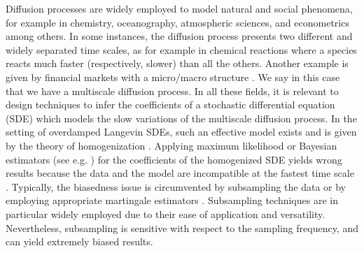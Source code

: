 \documentclass[10pt]{article}
\begin{document}
Diffusion processes are widely employed to model natural and social phenomena, for example in chemistry, oceanography, atmospheric sciences, and econometrics among others. In some instances, the diffusion process presents two different and widely separated time scales, as for example in chemical reactions where a species reacts much faster (respectively, slower) than all the others. Another example is given by financial markets with a micro/macro structure \cite{AiJ14}. We say in this case that we have a multiscale diffusion process. In all these fields, it is relevant to design techniques to infer the coefficients of a stochastic differential equation (SDE) which models the slow variations of the multiscale diffusion process. In the setting of overdamped Langevin SDEs, such an effective model exists and is given by the theory of homogenization \cite{BLP78,PaS08}. Applying maximum likelihood or Bayesian estimators (see e.g. \cite{PSV09,PSZ13,LiS01,LiS01b}) for the coefficients of the homogenized SDE yields wrong results because the data and the model are incompatible at the fastest time scale \cite{PaS07}. Typically, the biasedness issue is circumvented by subsampling the data \cite{PaS07} or by employing appropriate martingale estimators \cite{KPP15,KKP15}. Subsampling techniques are in particular widely employed \cite{ZMA05} due to their ease of application and versatility. Nevertheless, subsampling is sensitive with respect to the sampling frequency, and can yield extremely biased results.
\end{document}
